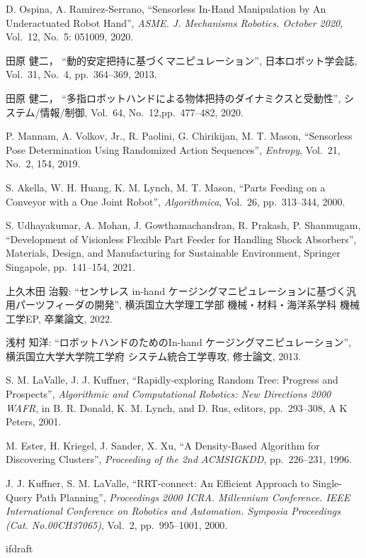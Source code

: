 \documentclass[a4paper,twoside,12pt,papersize, dvipdfmx]{iirthesis}
\begin{document}
\begin{thebibliography}{}
	D. Ospina, A. Ramirez-Serrano,
  	``Sensorless In-Hand Manipulation by An Underactuated Robot Hand'',
  	 {\it ASME. J. Mechanisms Robotics. October 2020},
  	 Vol.~12, No.~5: 051009, 
  	2020.

	田原 健二，
  	``動的安定把持に基づくマニピュレーション'',
  	 日本ロボット学会誌,
  	 Vol.~31, No.~4, pp.~364--369,
  	2013.  	

    	田原 健二，
  	``多指ロボットハンドによる物体把持のダイナミクスと受動性'',
  	 システム/情報/制御,
  	 Vol.~64, No.~12,pp.~477--482,
  	2020. 
  	
  	P. Mannam, A. Volkov, Jr., R. Paolini, G. Chirikijan, M. T. Mason,
  	``Sensorless Pose Determination Using Randomized Action Sequences'',
  	 {\it Entropy}, Vol.~21, No.~2, 154, 
  	2019.
  	
  	S. Akella, W. H. Huang, K. M. Lynch, M. T. Mason,
  	``Parts Feeding on a Conveyor with a One Joint Robot'',
  	 {\it Algorithmica},
  	 Vol.~26,
  	 pp.~313--344,
  	2000.
  	
  	S. Udhayakumar, A. Mohan, J. Gowthamachandran,  R. Prakash, P. Shanmugam,
  	``Development of Visionless Flexible Part Feeder for Handling Shock Absorbers'',
  	 Materials, Design, and Manufacturing for Sustainable Environment, Springer Singapole, 
  	 pp.~141--154,
  	2021.  	
  	
上久木田 治毅:
``センサレス in-hand ケージングマニピュレーションに基づく汎用パーツフィーダの開発'', 
横浜国立大学理工学部 機械・材料・海洋系学科 機械工学EP, 卒業論文, 2022.
  	
浅村 知洋:
``ロボットハンドのためのIn-hand ケージングマニピュレーション'', 
横浜国立大学大学院工学府 システム統合工学専攻, 修士論文, 2013.

  	S. M. LaValle, J. J. Kuffner, 
  	``Rapidly-exploring Random Tree: Progress and Prospects'', 
  	{\it Algorithmic and Computational Robotics: New Directions 2000 WAFR}, 
  	in B. R. Donald, K. M. Lynch, and D. Rus, editors, 
  	pp.~293--308, A K Peters, 2001.
  	
  	M. Ester, H. Kriegel, J. Sander, X. Xu, 
  	``A Density-Based Algorithm for Discovering Clusters'', 
  	{\it Proceeding of the 2nd ACMSIGKDD}, 
  	pp.~226--231, 1996.
  	
	J. J. Kuffner, S. M. LaValle, 
	``RRT-connect: An Efficient Approach to Single-Query Path Planning'',
	{\it Proceedings 2000 ICRA. Millennium Conference. IEEE International Conference on Robotics and Automation. Symposia Proceedings (Cat. No.00CH37065)}, 
	 Vol.~2, pp.~995--1001, 2000.
  	
\end{thebibliography}

\expandafter\ifx\csname ifdraft\endcsname\relax
    
\end{document}
